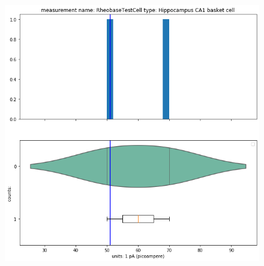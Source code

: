 \begin{figure} 
    \begin{center}   \includegraphics[scale=0.45]{figures/undersampled_distribution.png}
    \end{center}
\end{figure}   
    

